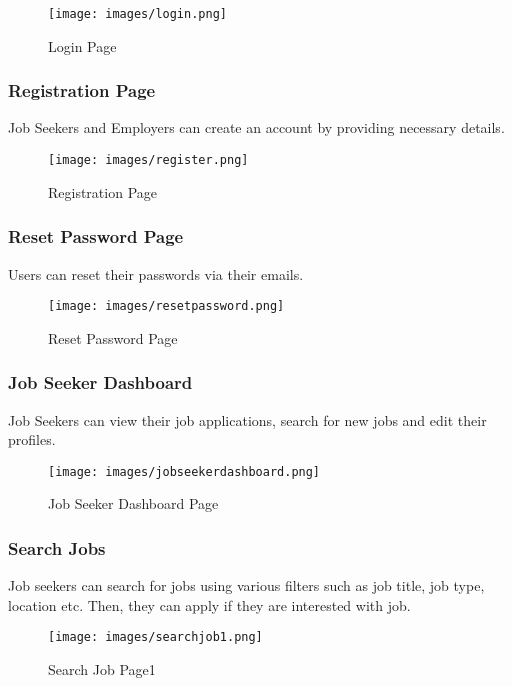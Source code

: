 \documentclass[a4paper,12pt]{article}
\begin{document}
\begin{figure}[h!]
    \centering
    \texttt{[image: images/login.png]} 
    \caption{Login Page}
    \label{fig:login}
\end{figure}

\newpage


\subsubsection{Registration Page}
Job Seekers and Employers can create an account by providing necessary details.

\begin{figure}[h!]
    \centering
    \texttt{[image: images/register.png]} 
    \caption{Registration Page}
    \label{fig:register}
\end{figure}

\newpage

\subsubsection{Reset Password Page}
Users can reset their passwords via their emails.

\begin{figure}[h!]
    \centering
    \texttt{[image: images/resetpassword.png]} 
    \caption{Reset Password Page}
    \label{fig:resetPassword}
\end{figure}

\newpage

\subsubsection{Job Seeker Dashboard}
Job Seekers can view their job applications, search for new jobs and edit their profiles.

\begin{figure}[h!]
    \centering
    \texttt{[image: images/jobseekerdashboard.png]} 
    \caption{Job Seeker Dashboard Page}
    \label{fig:seeker_dashboard}
\end{figure}

\subsubsection{Search Jobs}
Job seekers can search for jobs using various filters such as job title,  job type, location etc. Then, they can apply if they are interested with job.
\begin{figure}[h!]
    \centering
    \texttt{[image: images/searchjob1.png]} 
    \caption{Search Job Page1}
    \label{fig:search_job1}
\end{figure}
\end{document}
